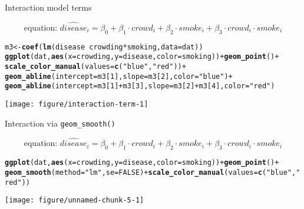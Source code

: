 \documentclass[table]{beamer}\usepackage[]{graphicx}\usepackage[]{color}
\makeatletter
\def\maxwidth{ %
  \ifdim\Gin@nat@width>\linewidth
    \linewidth
  \else
    \Gin@nat@width
  \fi
}
\newcommand{\hlnum}[1]{\textcolor[rgb]{0.686,0.059,0.569}{#1}}%
\newcommand{\hlstr}[1]{\textcolor[rgb]{0.192,0.494,0.8}{#1}}%
\newcommand{\hlopt}[1]{\textcolor[rgb]{0,0,0}{#1}}%
\newcommand{\hlstd}[1]{\textcolor[rgb]{0.345,0.345,0.345}{#1}}%
\newcommand{\hlkwb}[1]{\textcolor[rgb]{0.69,0.353,0.396}{#1}}%
\newcommand{\hlkwc}[1]{\textcolor[rgb]{0.333,0.667,0.333}{#1}}%
\newcommand{\hlkwd}[1]{\textcolor[rgb]{0.737,0.353,0.396}{\textbf{#1}}}%
\newenvironment{kframe}{%
 \def\at@end@of@kframe{}%
 \ifinner\ifhmode%
  \def\at@end@of@kframe{\end{minipage}}%
  \begin{minipage}{\columnwidth}%
 \fi\fi%
 \def\FrameCommand##1{\hskip\@totalleftmargin \hskip-\fboxsep
 \colorbox{shadecolor}{##1}\hskip-\fboxsep
     \hskip-\linewidth \hskip-\@totalleftmargin \hskip\columnwidth}%
 \MakeFramed {\advance\hsize-\width
   \@totalleftmargin\z@ \linewidth\hsize
   \@setminipage}}%
 {\par\unskip\endMakeFramed%
 \at@end@of@kframe}
\newenvironment{knitrout}{}{} %
\makeatother
\begin{document}
\begin{frame}[fragile]{Interaction model terms}

$$ \mbox{equation: \ }  \widehat{disease}_i = \beta_0 + \beta_1\cdot crowd_i + \beta_2\cdot smoke_i + \beta_3\cdot crowd_i \cdot smoke_i  $$

\begin{knitrout}\scriptsize
{}\color{fgcolor}\begin{kframe}
\begin{alltt}
\hlstd{m3} \hlkwb{<-} \hlkwd{coef}\hlstd{(}\hlkwd{lm}\hlstd{(disease} \hlopt{~} \hlstd{crowding}\hlopt{*}\hlstd{smoking,} \hlkwc{data}\hlstd{=dat))}
\hlkwd{ggplot}\hlstd{(dat,} \hlkwd{aes}\hlstd{(}\hlkwc{x}\hlstd{=crowding,} \hlkwc{y}\hlstd{=disease,} \hlkwc{color}\hlstd{=smoking))} \hlopt{+}  \hlkwd{geom_point}\hlstd{()} \hlopt{+}
  \hlkwd{scale_color_manual}\hlstd{(}\hlkwc{values} \hlstd{=} \hlkwd{c}\hlstd{(}\hlstr{"blue"}\hlstd{,} \hlstr{"red"}\hlstd{))} \hlopt{+}
  \hlkwd{geom_abline}\hlstd{(}\hlkwc{intercept} \hlstd{= m3[}\hlnum{1}\hlstd{],} \hlkwc{slope} \hlstd{= m3[}\hlnum{2}\hlstd{],} \hlkwc{color}\hlstd{=}\hlstr{"blue"}\hlstd{)} \hlopt{+}
  \hlkwd{geom_abline}\hlstd{(}\hlkwc{intercept} \hlstd{= m3[}\hlnum{1}\hlstd{]}\hlopt{+}\hlstd{m3[}\hlnum{3}\hlstd{],} \hlkwc{slope} \hlstd{= m3[}\hlnum{2}\hlstd{]}\hlopt{+}\hlstd{m3[}\hlnum{4}\hlstd{],} \hlkwc{color}\hlstd{=}\hlstr{"red"}\hlstd{)}
\end{alltt}
\end{kframe}
\texttt{[image: figure/interaction-term-1]} 

\end{knitrout}

\end{frame}



\begin{frame}[fragile]{Interaction via {\tt geom\_smooth()}}

$$ \mbox{equation: \ }  \widehat{disease}_i = \beta_0 + \beta_1\cdot crowd_i + \beta_2\cdot smoke_i + \beta_3\cdot crowd_i \cdot smoke_i  $$

\begin{knitrout}\scriptsize
{}\color{fgcolor}\begin{kframe}
\begin{alltt}
\hlkwd{ggplot}\hlstd{(dat,} \hlkwd{aes}\hlstd{(}\hlkwc{x}\hlstd{=crowding,} \hlkwc{y}\hlstd{=disease,} \hlkwc{color}\hlstd{=smoking))} \hlopt{+}  \hlkwd{geom_point}\hlstd{()} \hlopt{+}
  \hlkwd{geom_smooth}\hlstd{(}\hlkwc{method}\hlstd{=}\hlstr{"lm"}\hlstd{,} \hlkwc{se}\hlstd{=}\hlnum{FALSE}\hlstd{)} \hlopt{+} \hlkwd{scale_color_manual}\hlstd{(}\hlkwc{values} \hlstd{=} \hlkwd{c}\hlstd{(}\hlstr{"blue"}\hlstd{,} \hlstr{"red"}\hlstd{))}
\end{alltt}
\end{kframe}
\texttt{[image: figure/unnamed-chunk-5-1]} 

\end{knitrout}


\end{frame}
\end{document}
